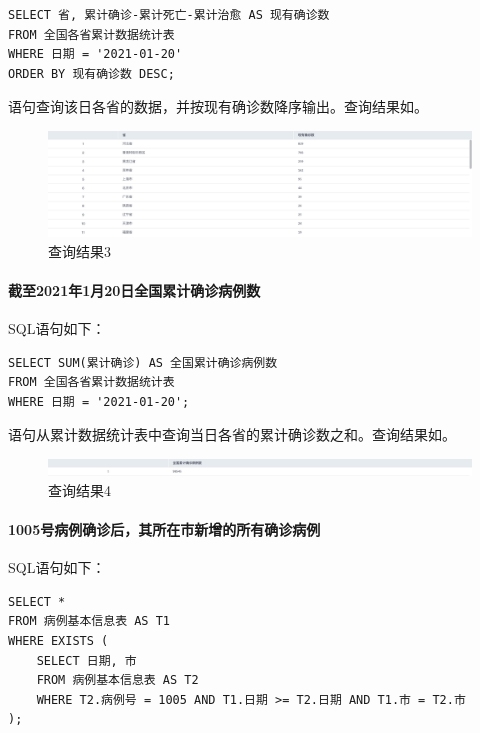 \documentclass[lang=cn,11pt,a4paper,cite=authornum]{paper}
\begin{document}
\begin{code}
\begin{verbatim}
SELECT 省, 累计确诊-累计死亡-累计治愈 AS 现有确诊数
FROM 全国各省累计数据统计表
WHERE 日期 = '2021-01-20'
ORDER BY 现有确诊数 DESC;
\end{verbatim}
\end{code}

语句查询该日各省的数据，并按现有确诊数降序输出。查询结果如。

\begin{figure}[!htb]
    \centering
    \includegraphics[width=\textwidth]{./images/lab1_query3.png}
    \caption{查询结果3\label{fig:query3}}
\end{figure}

\paragraph{截至2021年1月20日全国累计确诊病例数} SQL语句如下：

\begin{code}
\begin{verbatim}
SELECT SUM(累计确诊) AS 全国累计确诊病例数
FROM 全国各省累计数据统计表
WHERE 日期 = '2021-01-20';
\end{verbatim}
\end{code}

语句从累计数据统计表中查询当日各省的累计确诊数之和。查询结果如。

\begin{figure}[!htb]
    \centering
    \includegraphics[width=\textwidth]{./images/lab1_query4.png}
    \caption{查询结果4\label{fig:query4}}
\end{figure}

\paragraph{1005号病例确诊后，其所在市新增的所有确诊病例} SQL语句如下：

\begin{code}
\begin{verbatim}
SELECT *
FROM 病例基本信息表 AS T1
WHERE EXISTS (
    SELECT 日期, 市
    FROM 病例基本信息表 AS T2
    WHERE T2.病例号 = 1005 AND T1.日期 >= T2.日期 AND T1.市 = T2.市
);
\end{verbatim}
\end{code}
\end{document}
